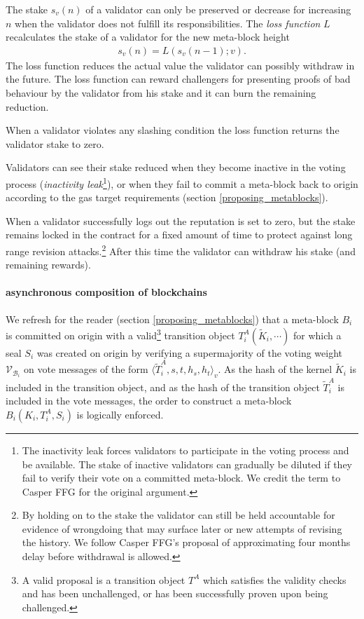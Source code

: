 \documentclass[12pt,a4paper]{article}
\begin{document}
The stake $s_v(n)$ of a validator can only be preserved or decrease for increasing $n$ when the validator does not fulfill its responsibilities.
The \emph{loss function} $L$ recalculates the stake of a validator for the new meta-block height
\begin{align}
  s_v(n) = L(s_v(n-1); v).
\end{align}
The loss function reduces the actual value the validator can possibly withdraw in the future.  The loss function can reward challengers for presenting proofs of bad behaviour by the validator from his stake and it can burn the remaining reduction.

When a validator violates any slashing condition the loss function returns the validator stake to zero.

Validators can see their stake reduced when they become inactive in the voting process (\emph{inactivity leak}\footnote{
  The inactivity leak forces validators to participate in the voting process and be available.
  The stake of inactive validators can gradually be diluted if they fail to verify their vote on a committed meta-block.
  We credit the term to Casper FFG\cite{casperffg} for the original argument.
}), or when they fail to commit a meta-block back to origin according to the gas target requirements (section  \ref{proposing_metablocks}).

When a validator successfully logs out the reputation is set to zero, but the stake remains locked in the contract for a fixed amount of time to protect against long range revision attacks.\footnote{
  By holding on to the stake the validator can still be held accountable for evidence of wrongdoing that may surface later or new attempts of revising the history.
  We follow Casper FFG's proposal of approximating four months delay before withdrawal is allowed.}
After this time the validator can withdraw his stake (and remaining rewards).

\paragraph{asynchronous composition of blockchains} We refresh for the reader (section \ref{proposing_metablocks}) that a meta-block $B_i$ is committed on origin with a valid\footnote{
  A valid proposal is a transition object $T^A$ which satisfies the validity checks and has been unchallenged, or has been successfully proven upon being challenged.
} transition object $T^A_i(\tilde{K}_i, \cdots)$ for which a seal $S_i$ was created on origin by verifying a supermajority of the voting weight $\mathcal{V}_{\mathcal{B}_i}$ on vote messages of the form $\langle \tilde{T}^A_i, s, t, h_s, h_t \rangle_v$.
As the hash of the kernel $\tilde{K}_i$ is included in the transition object, and as the hash of the transition object $\tilde{T}^A_i$ is included in the vote messages, the order to construct a meta-block $B_i(K_i, T^A_i, S_i)$ is logically enforced.
\end{document}
